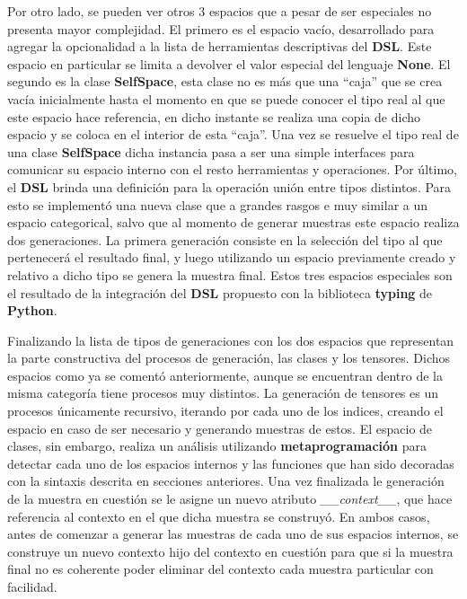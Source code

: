 Por otro lado, se pueden ver otros 3 espacios que a pesar de ser especiales no presenta mayor complejidad. El primero es el
espacio vacío, desarrollado para agregar la opcionalidad a la lista de herramientas descriptivas del {\bf DSL}. Este espacio en
particular se limita a devolver el valor especial del lenguaje {\bf None}. El segundo es la clase {\bf SelfSpace}, esta clase no es
más que una ``caja'' que se crea vacía inicialmente hasta el momento en que se puede conocer el tipo real al que este espacio hace
referencia, en dicho instante se realiza una copia de dicho espacio y se coloca en el interior de esta ``caja''. 
Una vez se resuelve el tipo real de una clase {\bf SelfSpace} dicha instancia pasa a ser una simple interfaces para 
comunicar su espacio interno con el resto herramientas y operaciones.
Por último, el {\bf DSL} brinda una definición para la operación unión entre tipos distintos.
Para esto se implementó una nueva clase que a grandes rasgos e muy similar a un espacio categorical, 
salvo que al momento de generar muestras este espacio realiza dos generaciones. 
La primera generación consiste en la
selección del tipo al que pertenecerá el resultado final, y luego utilizando un espacio previamente creado y relativo a dicho tipo
se genera la muestra final. Estos tres espacios especiales son el resultado de la integración del {\bf DSL} propuesto con la biblioteca
    {\bf typing} de {\bf Python}.

Finalizando la lista de tipos de generaciones con los dos espacios que representan la parte constructiva del procesos de generación,
las clases y los tensores. Dichos espacios como ya se comentó anteriormente, aunque se encuentran dentro de la misma categoría tiene
procesos muy distintos. La generación de tensores es un procesos únicamente recursivo, iterando por cada uno de los indices, creando
el espacio en caso de ser necesario y generando muestras de estos. El espacio de clases, sin embargo, realiza un análisis utilizando
    {\bf metaprogramación} para detectar cada uno de los espacios internos y las funciones que han sido decoradas con la sintaxis descrita en
secciones anteriores. Una vez finalizada le generación de la muestra en cuestión se le asigne un nuevo atributo {\it \_\_context\_\_},
que hace referencia al contexto en el que dicha muestra se construyó. En ambos casos, antes de comenzar a generar las muestras de
cada uno de sus espacios internos, se construye un nuevo contexto hijo del contexto en cuestión para que si la muestra
final no es coherente poder eliminar del contexto cada muestra particular con facilidad.

